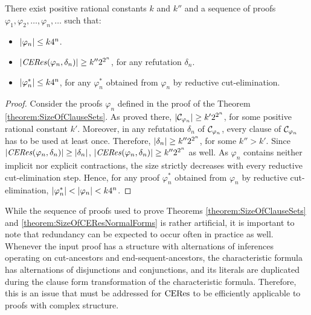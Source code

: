 \begin{theorem}
\label{theorem:SizeOfCEResNormalForms}
There exist positive rational constants $k$ and $k''$ and a sequence of proofs $\varphi_1, \varphi_2, \ldots, \varphi_n, \ldots$ such that:
\begin{itemize}
\item $|\varphi_n| \leq k 4^n$.
\item $|\mathit{CERes}(\varphi_n,\delta_n)| \geq k'' 2^{2^n}$, for any refutation $\delta_n$.
\item $|\varphi_n^*| \leq k 4^n$, for any $\varphi_n^*$ obtained from $\varphi_n$ by reductive cut-elimination.
\end{itemize}
\end{theorem}
\begin{proof}
Consider the proofs $\varphi_n$ defined in the proof of the Theorem \ref{theorem:SizeOfClauseSets}. As proved there, 
$|\mathcal{C}_{\varphi_n}| \geq k' 2^{2^n}$, for some positive rational constant $k'$. Moreover, in any refutation $\delta_n$ of $\mathcal{C}_{\varphi_n}$, every clause of $\mathcal{C}_{\varphi_n}$ has to be used at least once. Therefore, $|\delta_n| \geq k'' 2^{2^n}$, for some $k'' > k'$. Since $|\mathit{CERes}(\varphi_n,\delta_n)| \geq |\delta_n|$, $|\mathit{CERes}(\varphi_n,\delta_n)| \geq k'' 2^{2^n}$ as well. As $\varphi_n$ contains neither implicit nor explicit contractions, the size strictly decreases with every reductive cut-elimination step. Hence, for any proof $\varphi_n^*$ obtained from $\varphi_n$ by reductive cut-elimination, $|\varphi_n^*| < |\varphi_n| < k 4^n$.
\hfill\QED
\end{proof}

\noindent
While the sequence of proofs used to prove Theorems \ref{theorem:SizeOfClauseSets} and \ref{theorem:SizeOfCEResNormalForms} is rather artificial, it is important to note that redundancy can be expected to occur often in practice as well. Whenever the input proof has a structure with alternations of inferences operating on cut-ancestors and end-sequent-ancestors, the characteristic formula has alternations of disjunctions and conjunctions, and its literals are duplicated during the clause form transformation of the characteristic formula. Therefore, this is an issue that must be addressed for $\mathrm{CERes}$ to be efficiently applicable to proofs with complex structure.
